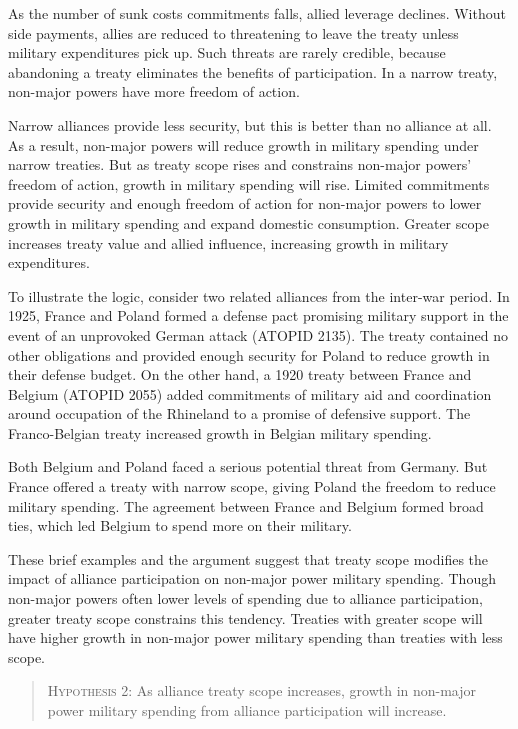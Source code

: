 \documentclass[12pt]{article}
\begin{document}
As the number of sunk costs commitments falls, allied leverage declines. 
Without side payments, allies are reduced to threatening to leave the treaty unless military expenditures pick up. 
Such threats are rarely credible, because abandoning a treaty eliminates the benefits of participation. 
In a narrow treaty, non-major powers have more freedom of action.  


Narrow alliances provide less security, but this is better than no alliance at all. 
As a result, non-major powers will reduce growth in military spending under narrow treaties. 
But as treaty scope rises and constrains non-major powers' freedom of action, growth in military spending will rise. 
Limited commitments provide security and enough freedom of action for non-major powers to lower growth in military spending and expand domestic consumption. 
Greater scope increases treaty value and allied influence, increasing growth in military expenditures. 


To illustrate the logic, consider two related alliances from the inter-war period. 
In 1925, France and Poland formed a defense pact promising military support in the event of an unprovoked German attack (ATOPID 2135). 
The treaty contained no other obligations and provided enough security for Poland to reduce growth in their defense budget.
On the other hand, a 1920 treaty between France and Belgium (ATOPID 2055) added commitments of military aid and coordination around occupation of the Rhineland to a promise of defensive support. 
The Franco-Belgian treaty increased growth in Belgian military spending. 


Both Belgium and Poland faced a serious potential threat from Germany. 
But France offered a treaty with narrow scope, giving Poland the freedom to reduce military spending. 
The agreement between France and Belgium formed broad ties, which led Belgium to spend more on their military. 


These brief examples and the argument suggest that treaty scope modifies the impact of alliance participation on non-major power military spending. 
Though non-major powers often lower levels of spending due to alliance participation, greater treaty scope constrains this tendency. 
Treaties with greater scope will have higher growth in non-major power military spending than treaties with less scope. 


\begin{quote}
\textsc{Hypothesis 2}: As alliance treaty scope increases, growth in non-major power military spending from alliance participation will increase. 
\end{quote}
\end{document}
